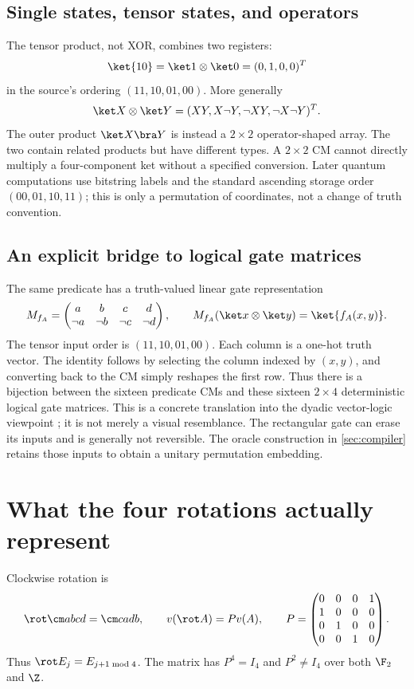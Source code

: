 \subsection{Single states, tensor states, and operators}
The tensor product, not XOR, combines two registers:
\begin{equation}
 \ket{10}=\ket1\otimes\ket0=(0,1,0,0)^T
\end{equation}
in the source's ordering $(11,10,01,00)$. More generally
\begin{equation}
 \ket X\otimes\ket Y=(XY,X\neg Y,\neg XY,\neg X\neg Y)^T.
\end{equation}
The outer product $\ket X\bra Y$ is instead a $2\times2$ operator-shaped array. The two contain related products but have different types. A $2\times2$ CM cannot directly multiply a four-component ket without a specified conversion. Later quantum computations use bitstring labels and the standard ascending storage order $(00,01,10,11)$; this is only a permutation of coordinates, not a change of truth convention.


\subsection{An explicit bridge to logical gate matrices}\label{sec:logicalgate}
The same predicate has a truth-valued linear gate representation
\begin{equation}\label{eq:logicalgate}
 M_{f_A}=\begin{pmatrix}a&b&c&d\\\neg a&\neg b&\neg c&\neg d\end{pmatrix},
 \qquad M_{f_A}(\ket x\otimes\ket y)=\ket{f_A(x,y)}.
\end{equation}
The tensor input order is $(11,10,01,00)$. Each column is a one-hot truth vector. The identity follows by selecting the column indexed by $(x,y)$, and converting back to the CM simply reshapes the first row. Thus there is a bijection between the sixteen predicate CMs and these sixteen $2\times4$ deterministic logical gate matrices. This is a concrete translation into the dyadic vector-logic viewpoint \cite{mizraji2008}; it is not merely a visual resemblance. The rectangular gate can erase its inputs and is generally not reversible. The oracle construction in \cref{sec:compiler} retains those inputs to obtain a unitary permutation embedding.

\section{What the four rotations actually represent}\label{sec:rotation}
Clockwise rotation is
\begin{equation}
 \rot\cm abcd=\cm cadb,\qquad
 v(\rot A)=Pv(A),\qquad
 P=\begin{pmatrix}0&0&0&1\\1&0&0&0\\0&1&0&0\\0&0&1&0\end{pmatrix}.
\end{equation}
Thus $\rot E_j=E_{j+1\bmod4}$. The matrix has $P^4=I_4$ and $P^2\ne I_4$ over both $\F_2$ and $\Z$.

